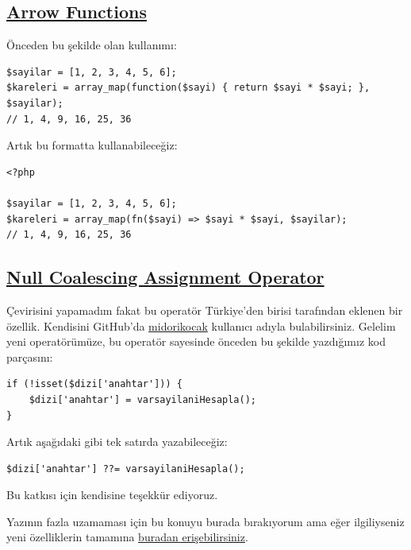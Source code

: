 \documentclass[11pt]{article}
\begin{document}
\subsection{\href{https://wiki.php.net/rfc/arrow\_functions\_v2}{Arrow Functions}}
\label{sec:orgaeb1ac7}
Önceden bu şekilde olan kullanımı:

\begin{verbatim}
$sayilar = [1, 2, 3, 4, 5, 6];
$kareleri = array_map(function($sayi) { return $sayi * $sayi; }, $sayilar);
// 1, 4, 9, 16, 25, 36
\end{verbatim}

Artık bu formatta kullanabileceğiz:
\begin{verbatim}
<?php

$sayilar = [1, 2, 3, 4, 5, 6];
$kareleri = array_map(fn($sayi) => $sayi * $sayi, $sayilar);
// 1, 4, 9, 16, 25, 36
\end{verbatim}
\subsection{\href{https://wiki.php.net/rfc/null\_coalesce\_equal\_operator}{Null Coalescing Assignment Operator}}
\label{sec:org7509424}
Çevirisini yapamadım fakat bu operatör Türkiye'den birisi tarafından eklenen
bir özellik. Kendisini GitHub'da \href{https://github.com/midorikocak}{midorikocak} kullanıcı adıyla
bulabilirsiniz. Gelelim yeni operatörümüze, bu operatör sayesinde önceden bu
şekilde yazdığımız kod parçasını:

\begin{verbatim}
if (!isset($dizi['anahtar'])) {
    $dizi['anahtar'] = varsayilaniHesapla();
}
\end{verbatim}

Artık aşağıdaki gibi tek satırda yazabileceğiz:
\begin{verbatim}
$dizi['anahtar'] ??= varsayilaniHesapla();
\end{verbatim}

Bu katkısı için kendisine teşekkür ediyoruz.

Yazının fazla uzamaması için bu konuyu burada bırakıyorum ama eğer
ilgiliyseniz yeni özelliklerin tamamına \href{https://github.com/php/php-src/blob/php-7.4.0beta1/UPGRADING}{buradan erişebilirsiniz}.
\end{document}
